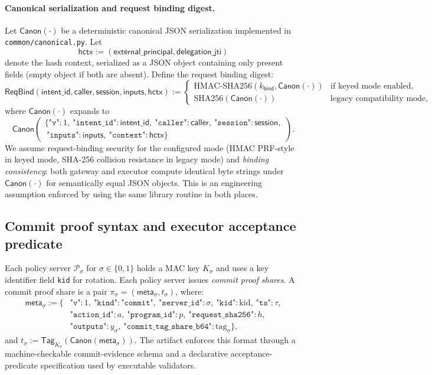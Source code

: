 \paragraph{Canonical serialization and request binding digest.}
Let $\mathsf{Canon}(\cdot)$ be a deterministic canonical JSON serialization implemented in
\texttt{common/canonical.py}. Let
\[
\mathsf{hctx} := (\mathsf{external\_principal},\mathsf{delegation\_jti})
\]
denote the hash context, serialized as a JSON object containing only present fields (empty object if
both are absent). Define the request binding digest:
\[
\mathsf{ReqBind}(\mathsf{intent\_id},\mathsf{caller},\mathsf{session},\mathsf{inputs},\mathsf{hctx}) :=
\left\{
\begin{array}{ll}
\mathrm{HMAC\text{-}SHA256}(k_{\mathsf{bind}},\mathsf{Canon}(\cdot)) & \text{if keyed mode enabled},\\
\mathrm{SHA256}(\mathsf{Canon}(\cdot)) & \text{legacy compatibility mode},
\end{array}
\right.
\]
where $\mathsf{Canon}(\cdot)$ expands to
\[
\mathsf{Canon}\!\left(
\begin{array}{l}
\{\texttt{"v"}:1,\ \texttt{"intent\_id"}:\mathsf{intent\_id},\ \texttt{"caller"}:\mathsf{caller},\ \texttt{"session"}:\mathsf{session},\\
\ \texttt{"inputs"}:\mathsf{inputs},\ \texttt{"context"}:\mathsf{hctx}\}
\end{array}\right).
\]
We assume request-binding security for the configured mode (HMAC PRF-style in keyed mode, SHA-256
collision resistance in legacy mode) and \emph{binding consistency}: both gateway and executor
compute identical byte strings under $\mathsf{Canon}(\cdot)$ for semantically equal JSON objects.
This is an engineering assumption enforced by using the same library routine in both places.

\subsection{Commit proof syntax and executor acceptance predicate}
\label{app:proofs:accept}

Each policy server $\mathcal{P}_\sigma$ for $\sigma\in\{0,1\}$ holds a MAC key $K_\sigma$ and uses a
key identifier field \texttt{kid} for rotation.
Each policy server issues \emph{commit proof shares}. A commit proof share is a pair
$\pi_\sigma = (\mathsf{meta}_\sigma, t_\sigma)$, where:
\begin{align*}
\mathsf{meta}_\sigma := \{&
\texttt{"v"}:1,\ \texttt{"kind"}:\texttt{"commit"},\ \texttt{"server\_id"}:\sigma,\ \texttt{"kid"}:\mathrm{kid},\ \texttt{"ts"}:\tau,\\
&\texttt{"action\_id"}:a,\ \texttt{"program\_id"}:p,\ \texttt{"request\_sha256"}:h,\\
&\texttt{"outputs"}:y_\sigma,\ \texttt{"commit\_tag\_share\_b64"}:\mathrm{tag}_\sigma\},
\end{align*}
and $t_\sigma := \mathsf{Tag}_{K_\sigma}(\mathsf{Canon}(\mathsf{meta}_\sigma))$.
The artifact enforces this format through a machine-checkable commit-evidence schema and
a declarative acceptance-predicate specification used by executable validators.

